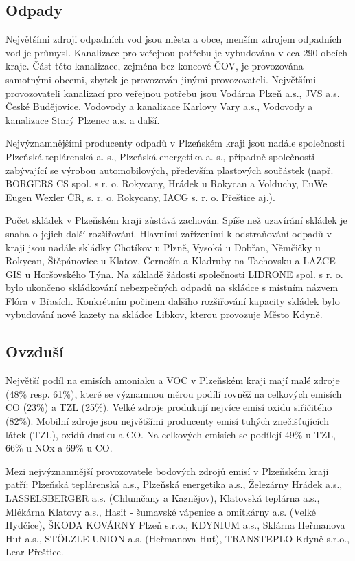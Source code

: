 \documentclass[12pt]{article} %
\begin{document}
\subsection{Odpady}
Největšími zdroji odpadních vod jsou města a obce, menším zdrojem odpadních vod je 
průmysl. Kanalizace pro veřejnou potřebu je vybudována v cca 290 obcích kraje. Část 
této kanalizace, zejména bez koncové ČOV, je provozována samotnými obcemi, zbytek je 
provozován jinými provozovateli. Největšími provozovateli kanalizací pro veřejnou potřebu 
jsou Vodárna Plzeň a.s., JVS a.s. České Budějovice, Vodovody a kanalizace Karlovy Vary 
a.s., Vodovody a kanalizace Starý Plzenec a.s. a další.

Nejvýznamnějšími producenty odpadů v Plzeňském kraji jsou nadále společnosti Plzeňská 
teplárenská a. s., Plzeňská energetika a. s., případně společnosti zabývající se výrobou 
automobilových, především plastových součástek (např. BORGERS CS spol. s r. o. 
Rokycany, Hrádek u Rokycan a Volduchy, EuWe Eugen Wexler ČR, s. r. o. Rokycany, 
IACG s. r. o. Přeštice aj.).

Počet skládek v Plzeňském kraji zůstává zachován. Spíše než uzavírání skládek je snaha 
o jejich další rozšiřování. Hlavními zařízeními k odstraňování odpadů v kraji jsou nadále 
skládky Chotíkov u Plzně, Vysoká u Dobřan, Němčičky u Rokycan, Štěpánovice u Klatov, 
Černošín a Kladruby na Tachovsku a LAZCE-GIS u Horšovského Týna. Na základě žádosti 
společnosti LIDRONE spol. s r. o. bylo ukončeno skládkování nebezpečných odpadů na 
skládce s místním názvem Flóra v Břasích. Konkrétním počinem dalšího rozšiřování kapacity 
skládek bylo vybudování nové kazety na skládce Libkov, kterou provozuje Město Kdyně.

\subsection{Ovzduší}
Největší podíl na emisích amoniaku a VOC v Plzeňském kraji mají malé zdroje (48\% resp. 
61\%), které se významnou měrou podílí rovněž na celkových emisích CO (23\%) a TZL 
(25\%). Velké zdroje produkují nejvíce emisí oxidu siřičitého (82\%). Mobilní zdroje jsou 
největšími producenty emisí tuhých znečišťujících látek (TZL), oxidů dusíku a CO. Na 
celkových emisích se podílejí 49\% u TZL, 66\% u NOx a 69\% u CO.

Mezi nejvýznamnější provozovatele bodových zdrojů emisí v Plzeňském kraji patří: Plzeňská 
teplárenská a.s., Plzeňská energetika a.s., Železárny Hrádek a.s., LASSELSBERGER 
a.s. (Chlumčany a Kaznějov), Klatovská teplárna a.s., Mlékárna Klatovy a.s., Hasit - 
šumavské vápenice a omítkárny a.s. (Velké Hydčice), ŠKODA KOVÁRNY Plzeň s.r.o., 
KDYNIUM a.s., Sklárna Heřmanova Huť a.s., STÖLZLE-UNION a.s. (Heřmanova Huť), 
TRANSTEPLO Kdyně s.r.o., Lear Přeštice.
\end{document}

